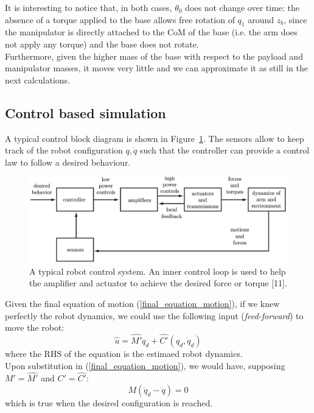 \documentclass[a4paper,12pt,oneside]{report}
\begin{document}
It is interesting to notice that, in both cases, $\theta_0$ does not change over time: the absence of a torque applied to the base allows free rotation of $q_1$ around $z_b$, since the manipulator is directly attached to the CoM of the base (i.e. the arm does not apply any torque) and the base does not rotate.\\
Furthermore, given the higher mass of the base with respect to the payload and manipulator masses, it moves very little and we can approximate it as still in the next calculations.\\
\subsection{Control based simulation}
A typical control block diagram is shown in Figure~\ref{block_diagram}. The sensors allow to keep track of the robot configuration $q,\dot{q}$ such that the controller can provide a control law to follow a desired behaviour.\\
\begin{figure}
  \centering
  \includegraphics[scale=0.4]{control_diagram.png}
  \caption{A typical robot control system. An inner control loop is used to help the amplifier and actuator to achieve the desired force or torque [11].}
  \label{block_diagram}
\end{figure}
Given the final equation of motion (\ref{final_equation_motion}), if we knew perfectly the robot dynamics, we could use the following input (\textit{feed-forward}) to move the robot:
\begin{equation}
  \hat{u}=\hat{M'}\ddot{q}_d+\hat{C'}(q_d,\dot{q}_d)
\end{equation}
where the RHS of the equation is the estimaed robot dynamics.\\
Upon substitution in (\ref{final_equation_motion}), we would have, supposing $M'=\hat{M'}$ and $C'=\hat{C'}$:
\begin{equation}
  M(\ddot{q}_d-\ddot{q})=0
\end{equation}
which is true when the desired configuration is reached.\\
\end{document}
